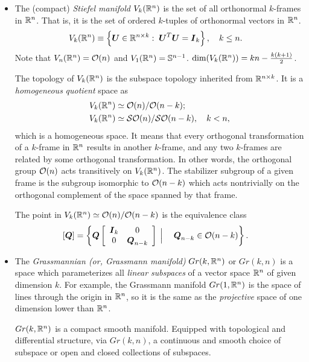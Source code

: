 \documentclass[11pt]{article}
\begin{document}
\begin{itemize}
\item The (compact) \emph{Stiefel manifold} $V_{k}({\mathbb R}^{n})$ is the set of all orthonormal $k$-frames in ${\mathbb R}^n$. That is, it is the set of ordered $k$-tuples of orthonormal vectors in ${\mathbb R}^n$.  
\begin{align*}
V_{k}({\mathbb R}^{n}) &\equiv \left\{\boldsymbol{U}\in {\mathbb R}^{n\times k}:\;  \boldsymbol{U}^{T}\boldsymbol{U} =  \boldsymbol{I}_{k}\right\},\quad k\le n.
\end{align*}
Note that $V_{n}({\mathbb R}^{n}) = {\mathcal O}(n)$ and $V_{1}({\mathbb R}^{n}) = {\mathbb S}^{n-1}$. $\text{dim}(V_{k}({\mathbb R}^{n})) = kn - \frac{k(k+1)}{2}$.

The topology of $V_{k}({\mathbb R}^{n})$ is the subspace topology inherited from ${\mathbb R}^{n\times k}$. It is a \emph{homogeneous} \emph{quotient} space as
\begin{align*}
V_{k}({\mathbb R}^{n}) &\simeq  {\mathcal O}(n)/{\mathcal O}(n-k);\\
V_{k}({\mathbb R}^{n}) &\simeq  {\mathcal S}{\mathcal O}(n)/{\mathcal S}{\mathcal O}(n-k),\quad k<n,
\end{align*} which is a homogeneous space.
It means that every orthogonal transformation of a $k$-frame in ${\mathbb R}^{n}$ results in another $k$-frame, and any two $k$-frames are related by some orthogonal transformation. In other words, the orthogonal group ${\mathcal O}(n)$ acts transitively on $V_{k}({\mathbb R}^{n})$. The stabilizer subgroup of a given frame is the subgroup isomorphic to ${\mathcal O}(n-k)$ which acts nontrivially on the orthogonal complement of the space spanned by that frame.

The point in $V_{k}({\mathbb R}^{n}) \simeq  {\mathcal O}(n)/{\mathcal O}(n-k)$ is the equivalence class 
\begin{align*}
\left[\boldsymbol{Q}\right] &= \left\{\boldsymbol{Q}\left[\begin{array}{cc}
\boldsymbol{I}_{k} & 0 \\ 
0 & \boldsymbol{Q}_{n-k}
\end{array} \right]\;\Big| \; \quad   \boldsymbol{Q}_{n-k} \in {\mathcal O}(n-k) \right\}.
\end{align*}
\vspace{15pt}

\item The \emph{Grassmannian (or, Grassmann manifold)}  $Gr(k, {\mathbb R}^{n})$ or $Gr(k, n)$ is a space which parameterizes all \emph{linear subspaces} of a vector space ${\mathbb R}^{n}$ of given dimension $k$. For example, the Grassmann manifold $Gr(1, {\mathbb R}^{n})$ is the space of lines through the origin in ${\mathbb R}^{n}$, so it is the same as the \emph{projective} space of one dimension lower than ${\mathbb R}^{n}$.

$Gr(k, {\mathbb R}^{n})$ is a compact smooth manifold. Equipped with topological and differential structure, via $Gr(k,n)$, a continuous and smooth choice of subspace or open and closed collections of subspaces.


\end{itemize}
\end{document}
